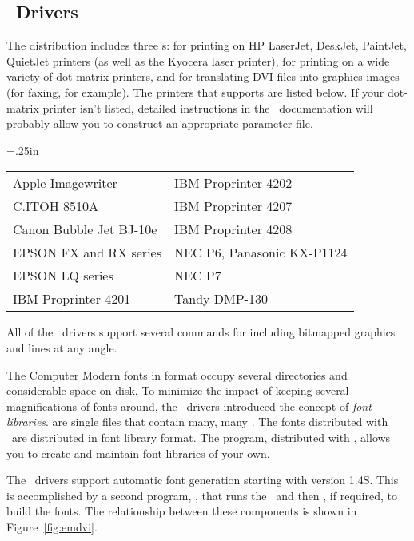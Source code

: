 \subsection{\protect\emTeX\ Drivers}

The \emTeX{} distribution 
includes three \dvidriver{}s:  for
printing on HP LaserJet, DeskJet, PaintJet, QuietJet printers 
(as well as the Kyocera laser printer),  
for printing on a wide variety of dot-matrix printers, and
 for translating DVI files into
 graphics images (for faxing, for example).
The printers that  supports are listed below.  
If your dot-matrix
printer isn't listed, detailed instructions in the \emTeX\ documentation
will probably allow you to construct an appropriate parameter file.

{\LTleft=.25in
\begin{longtable}{ll}
  Apple Imagewriter          & IBM Proprinter 4202        \\
  C.ITOH 8510A               & IBM Proprinter 4207        \\ 
  Canon Bubble Jet BJ-10e    & IBM Proprinter 4208        \\
  EPSON FX and RX series     & NEC P6, Panasonic KX-P1124 \\
  EPSON LQ series            & NEC P7                     \\
  IBM Proprinter 4201        & Tandy DMP-130
\end{longtable}%
}
\vspace{-4pt}
All of the \emTeX\ drivers support several  commands for
including bitmapped graphics and lines at any angle.

The Computer Modern fonts in  format occupy several directories
and considerable space on disk.  To minimize the impact of keeping several
magnifications of fonts around, the \emTeX\ drivers introduced the concept
of \textit{font libraries}.   are 
single files that contain many,
many .  The fonts 
distributed with \emTeX\ are distributed
in font library format.  The  program, distributed with
\emTeX, allows you to create and maintain font libraries of your own.

The \emTeX\ drivers support automatic font generation starting with 
version 1.4S.  This is accomplished by a second program, ,
that runs the \dvidriver\ and then , if required, to build
the fonts.  The relationship between these components is shown in
Figure~\ref{fig:emdvi}.

